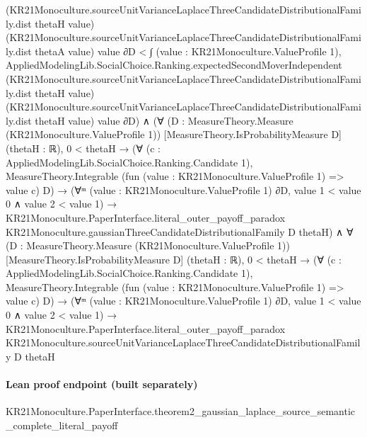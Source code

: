 \documentclass[10pt]{article}
\begin{document}
\begin{ReviewVerbatim}
                                    (KR21Monoculture.sourceUnitVarianceLaplaceThreeCandidateDistributionalFamily.dist
                                      thetaH value)
                                    (KR21Monoculture.sourceUnitVarianceLaplaceThreeCandidateDistributionalFamily.dist
                                      thetaA value)
                                    value ∂D <
                                ∫ (value : KR21Monoculture.ValueProfile 1),
                                  AppliedModelingLib.SocialChoice.Ranking.expectedSecondMoverIndependent
                                    (KR21Monoculture.sourceUnitVarianceLaplaceThreeCandidateDistributionalFamily.dist
                                      thetaH value)
                                    (KR21Monoculture.sourceUnitVarianceLaplaceThreeCandidateDistributionalFamily.dist
                                      thetaH value)
                                    value ∂D) ∧
                (∀ (D : MeasureTheory.Measure (KR21Monoculture.ValueProfile 1)) [MeasureTheory.IsProbabilityMeasure D]
                    (thetaH : ℝ),
                    0 < thetaH →
                      (∀ (c : AppliedModelingLib.SocialChoice.Ranking.Candidate 1),
                          MeasureTheory.Integrable (fun (value : KR21Monoculture.ValueProfile 1) => value c) D) →
                        (∀ᵐ (value : KR21Monoculture.ValueProfile 1) ∂D, value 1 < value 0 ∧ value 2 < value 1) →
                          KR21Monoculture.PaperInterface.literal_outer_payoff_paradox
                            KR21Monoculture.gaussianThreeCandidateDistributionalFamily D thetaH) ∧
                  ∀ (D : MeasureTheory.Measure (KR21Monoculture.ValueProfile 1)) [MeasureTheory.IsProbabilityMeasure D]
                    (thetaH : ℝ),
                    0 < thetaH →
                      (∀ (c : AppliedModelingLib.SocialChoice.Ranking.Candidate 1),
                          MeasureTheory.Integrable (fun (value : KR21Monoculture.ValueProfile 1) => value c) D) →
                        (∀ᵐ (value : KR21Monoculture.ValueProfile 1) ∂D, value 1 < value 0 ∧ value 2 < value 1) →
                          KR21Monoculture.PaperInterface.literal_outer_payoff_paradox
                            KR21Monoculture.sourceUnitVarianceLaplaceThreeCandidateDistributionalFamily D thetaH
\end{ReviewVerbatim}

\paragraph{Lean proof endpoint (built separately)}\begin{ReviewVerbatim}
KR21Monoculture.PaperInterface.theorem2_gaussian_laplace_source_semantic_complete_literal_payoff
\end{ReviewVerbatim}
\end{document}

